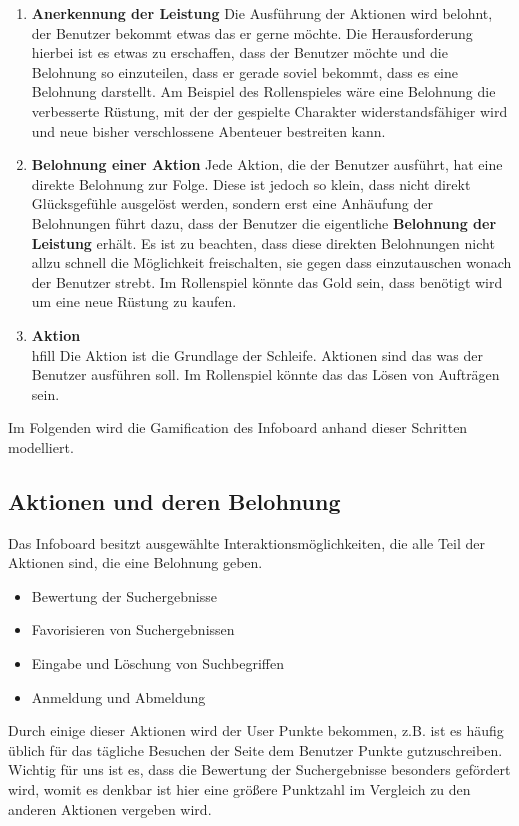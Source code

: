 \documentclass[12pt,twoside]{book}
\begin{document}
\begin{enumerate}
  \item \textbf{Anerkennung der Leistung} \hfill
  Die Ausführung der Aktionen wird belohnt, der Benutzer bekommt etwas das er gerne möchte. Die Herausforderung hierbei ist es etwas zu erschaffen, dass der Benutzer möchte und die Belohnung so einzuteilen, dass er gerade soviel bekommt, dass es eine Belohnung darstellt. Am Beispiel des Rollenspieles wäre eine Belohnung die verbesserte Rüstung, mit der der gespielte Charakter widerstandsfähiger wird und neue bisher verschlossene Abenteuer bestreiten kann.
  \item \textbf{Belohnung einer Aktion}\hfill
  Jede Aktion, die der Benutzer ausführt, hat eine direkte Belohnung zur Folge. Diese ist jedoch so klein, dass nicht direkt Glücksgefühle ausgelöst werden, sondern erst eine Anhäufung der Belohnungen führt dazu, dass der Benutzer die eigentliche \textbf{Belohnung der Leistung} erhält. Es ist zu beachten, dass diese direkten Belohnungen nicht allzu schnell die Möglichkeit freischalten, sie gegen dass einzutauschen wonach der Benutzer strebt. Im Rollenspiel könnte das Gold sein, dass benötigt wird um eine neue Rüstung zu kaufen.
  \item \textbf{Aktion}\\hfill
  Die Aktion ist die Grundlage der Schleife. Aktionen sind das was der Benutzer ausführen soll. Im Rollenspiel könnte das das Lösen von Aufträgen sein.
\end{enumerate}

Im Folgenden wird die Gamification des Infoboard anhand dieser Schritten modelliert.

\subsection{Aktionen und deren Belohnung}

Das Infoboard besitzt ausgewählte Interaktionsmöglichkeiten, die alle Teil der Aktionen sind, die eine Belohnung geben.

\begin{itemize}
  \item Bewertung der Suchergebnisse
  \item Favorisieren von Suchergebnissen
  \item Eingabe und Löschung von Suchbegriffen
  \item Anmeldung und Abmeldung
\end{itemize}

Durch einige dieser Aktionen wird der User Punkte bekommen, z.B. ist es häufig üblich für das tägliche Besuchen der Seite dem Benutzer Punkte gutzuschreiben. Wichtig für uns ist es, dass die Bewertung der Suchergebnisse besonders gefördert wird, womit es denkbar ist hier eine größere Punktzahl im Vergleich zu den anderen Aktionen vergeben wird.
\end{document}
